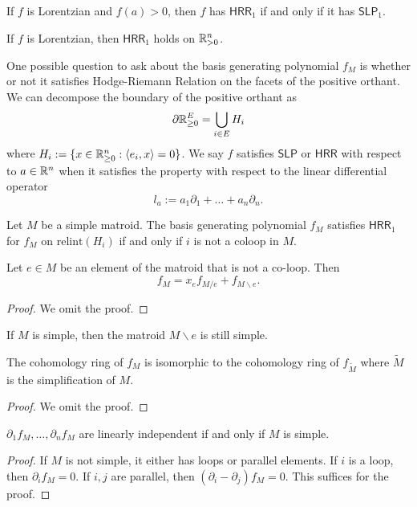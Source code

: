 \documentclass[12pt]{article}
\begin{document}
\begin{lem}
	If $f$ is Lorentzian and $f(a) > 0$, then $f$ has $\mathsf{HRR}_1$ if and only if it has $\mathsf{SLP}_1$. 
\end{lem}

\begin{lem}
	If $f$ is Lorentzian, then $\mathsf{HRR}_1$ holds on $\mathbb{R}_{> 0}^n$. 
\end{lem}

One possible question to ask about the basis generating polynomial $f_M$ is whether or not it satisfies Hodge-Riemann Relation on the facets of the positive orthant. We can decompose the boundary of the positive orthant as 
\[
	\partial \mathbb{R}_{\geq 0}^E = \bigcup_{i \in E} H_i
\]
where $H_i := \{x \in \mathbb{R}_{\geq 0}^n : \langle e_i, x \rangle = 0\}$. We say $f$ satisfies $\mathsf{SLP}$ or $\mathsf{HRR}$ with respect to $a \in \mathbb{R}^n$ when it satisfies the property with respect to the linear differential operator
\[
	l_a := a_1 \partial_1 + \ldots + a_n \partial_n. 
\]

\begin{conj}
	Let $M$ be a simple matroid. The basis generating polynomial $f_M$ satisfies $\mathsf{HRR}_1$ for $f_M$ on $\text{relint}(H_i)$ if and only if $i$ is not a coloop in $M$. 
\end{conj}

\begin{fact}
	Let $e \in M$ be an element of the matroid that is not a co-loop. Then 
	\[
		f_M = x_e f_{M / e} + f_{M \backslash e}.
	\]
\end{fact}
\begin{proof}
	We omit the proof. 
\end{proof}

If $M$ is simple, then the matroid $M \backslash e$ is still simple. 

\begin{fact}
	The cohomology ring of $f_M$ is isomorphic to the cohomology ring of $f_{\widetilde{M}}$ where $\widetilde{M}$ is the simplification of $M$. 
\end{fact}

\begin{proof}
	We omit the proof. 
\end{proof}


\begin{prop}
	$\partial_1 f_M, \ldots, \partial_n f_M$ are linearly independent if and only if $M$ is simple.  
\end{prop}
\begin{proof}
	If $M$ is not simple, it either has loops or parallel elements. If $i$ is a loop, then $\partial_i f_M = 0$. If $i, j$ are parallel, then $(\partial_i - \partial_j) f_M = 0$. This suffices for the proof. 
\end{proof}
\end{document}
